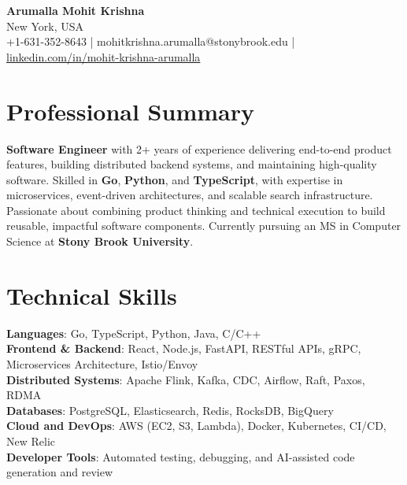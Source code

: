 \documentclass[letterpaper,11pt]{article}
\begin{document}
\begin{center}
  {\Large \textbf{Arumalla Mohit Krishna}} \\
  New York, USA \\
  +1-631-352-8643 \enspace | \enspace mohitkrishna.arumalla@stonybrook.edu \enspace | \enspace \href{https://www.linkedin.com/in/mohit-krishna-arumalla}{linkedin.com/in/mohit-krishna-arumalla}
\end{center}

\section{Professional Summary}
  \begin{itemize}[leftmargin=0.15in, label={}]
    \small{\item{
     \textbf{Software Engineer} with 2+ years of experience delivering end-to-end product features, building distributed backend systems, and maintaining high-quality software. Skilled in \textbf{Go}, \textbf{Python}, and \textbf{TypeScript}, with expertise in microservices, event-driven architectures, and scalable search infrastructure. Passionate about combining product thinking and technical execution to build reusable, impactful software components. Currently pursuing an MS in Computer Science at \textbf{Stony Brook University}.
    }}
  \end{itemize}
\vspace{-16pt}

\section{Technical Skills}
 \begin{itemize}[leftmargin=0.15in, label={}]
    \small{\item{
     \textbf{Languages}: Go, TypeScript, Python, Java, C/C++ \\
     \textbf{Frontend \& Backend}: React, Node.js, FastAPI, RESTful APIs, gRPC, Microservices Architecture, Istio/Envoy \\
     \textbf{Distributed Systems}: Apache Flink, Kafka, CDC, Airflow, Raft, Paxos, RDMA \\
     \textbf{Databases}: PostgreSQL, Elasticsearch, Redis, RocksDB, BigQuery \\
     \textbf{Cloud and DevOps}: AWS (EC2, S3, Lambda), Docker, Kubernetes, CI/CD, New Relic \\
     \textbf{Developer Tools}: Automated testing, debugging, and AI-assisted code generation and review
    }}
 \end{itemize}
\vspace{-16pt}
\end{document}
